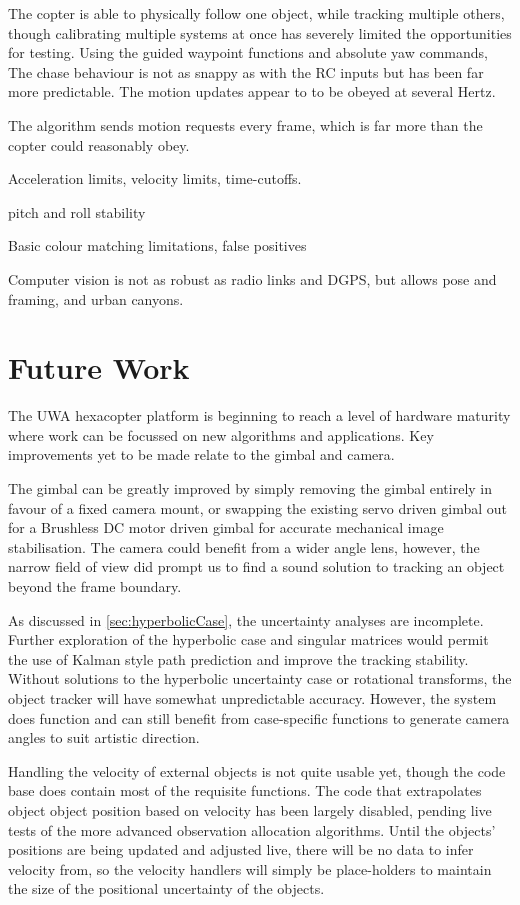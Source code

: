 \documentclass[a4paper, 11pt, titlepage]{article}
\begin{document}
    The copter is able to physically follow one object, while tracking multiple others, though calibrating multiple systems at once has severely limited the opportunities for testing.
    Using the guided waypoint functions and absolute yaw commands, The chase behaviour is not as snappy as with the RC inputs but has been far more predictable.  The motion updates appear to to be obeyed at several Hertz.
    
    The algorithm sends motion requests every frame, which is far more than the copter could reasonably obey.



    Acceleration limits, velocity limits, time-cutoffs.

    pitch and roll stability

    Basic colour matching limitations, false positives

    Computer vision is not as robust as radio links and DGPS, but allows pose and framing, and urban canyons.

\section{Future Work}

  The UWA hexacopter platform is beginning to reach a level of hardware maturity where work can be focussed on new algorithms and applications.  Key improvements yet to be made relate to the gimbal and camera.

  The gimbal can be greatly improved by simply removing the gimbal entirely in favour of a fixed camera mount, or swapping the existing servo driven gimbal out for a Brushless DC motor driven gimbal for accurate mechanical image stabilisation.  The camera could benefit from a wider angle lens, however, the narrow field of view did prompt us to find a sound solution to tracking an object beyond the frame boundary.

  As discussed in \ref{sec:hyperbolicCase}, the uncertainty analyses are incomplete.  Further exploration of the hyperbolic case and singular matrices would permit the use of Kalman style path prediction and improve the tracking stability.
  Without solutions to the hyperbolic uncertainty case or rotational transforms, the object tracker will have somewhat unpredictable accuracy.  However, the system does function and can still benefit from case-specific functions to generate camera angles to suit artistic direction.

  Handling the velocity of external objects is not quite usable yet, though the code base does contain most of the requisite functions.  The code that extrapolates object object position based on velocity has been largely disabled, pending live tests of the more advanced observation allocation algorithms.  Until the objects' positions are being updated and adjusted live, there will be no data to infer velocity from, so the velocity handlers will simply be place-holders to maintain the size of the positional uncertainty of the objects.
\end{document}
